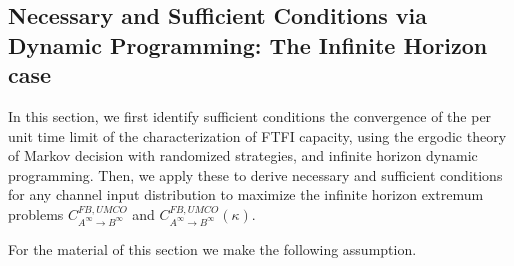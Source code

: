 \documentclass[11pt, a4paper, journal,onecolumn]{IEEEtran}
\newcommand{\mb}{\mathbb}
\newcommand{\rar}{\rightarrow}
\newcommand{\hso}{\hspace{.1in}}
\newtheorem{theorem}{Theorem}[section]
\begin{document}
%
%
%
%
%
%
%
%

\subsection{Necessary and Sufficient Conditions via Dynamic Programming: The Infinite Horizon case}\label{subsec.DPandALG_IH}
In this section, we first  identify sufficient conditions the convergence of the per unit time limit of the characterization of FTFI capacity, using the ergodic theory of Markov decision with randomized strategies, and infinite  horizon dynamic programming. Then, we apply these  to derive  necessary and sufficient conditions  for any channel input distribution to maximize the  infinite horizon extremum problems 
$C_{A^\infty \rar B^\infty}^{FB,UMCO}$ and $C_{A^\infty \rar B^\infty}^{FB,UMCO}(\kappa)$.  
\par For the material of this section we make the following assumption.\\
\end{document}
